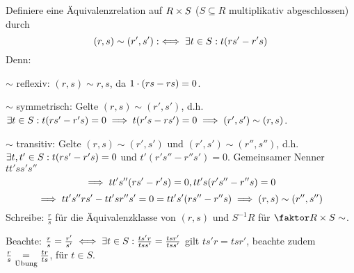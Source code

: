\documentclass[a4paper]{report}
\begin{document}
\begin{defi}
  Definiere eine Äquivalenzrelation auf $R \tm S$ ($S \subseteq R$ multiplikativ abgeschlossen) durch \[(r,s) \sim(r',s') :\iff \ex t \in S : t (rs' - r's)\]
  Denn:
  \item $\sim$ reflexiv: $(r,s) \sim r,s$, da $1 \cd (rs-rs) = 0$.
  \item $\sim$ symmetrisch: Gelte $(r,s) \sim (r', s')$, d.h. $\ex t \in S : t(rs' - r's) = 0 \imp t(r's - rs') = 0 \imp (r',s') \sim (r,s)$.
  \item $\sim$ transitiv: Gelte $(r,s) \sim (r',s')$ und $(r',s') \sim (r'',s'')$, d.h. $\ex t, t' \in S : t(rs' - r's) = 0$ und $t'(r's'' - r''s') = 0$. Gemeinsamer Nenner $tt'ss's''$
  \[\imp tt's''(rs'-r's) = 0, tt's(r's''-r''s) = 0\]
  \[\imp tt's''rs' - tt'sr{''}s' = 0 = tt's'(rs'' - r''s) \imp (r,s) \sim (r'',s'')\]
  Schreibe: $\frac rs$ für die Äquivalenzklasse von $(r,s)$ und $S^{-1}R$ für $\fak {R \tm S}\sim$.
  \item Beachte: $\frac rs = \frac{r'}{s'} \iff \ex t \in S : \frac{ts'r}{tss'} = \frac{tsr'}{tss'}$ gilt $ts'r = tsr'$, beachte zudem $\frac rs \ueb = \frac {tr}{ts}$, für $t \in S$.
\end{defi}
\end{document}

